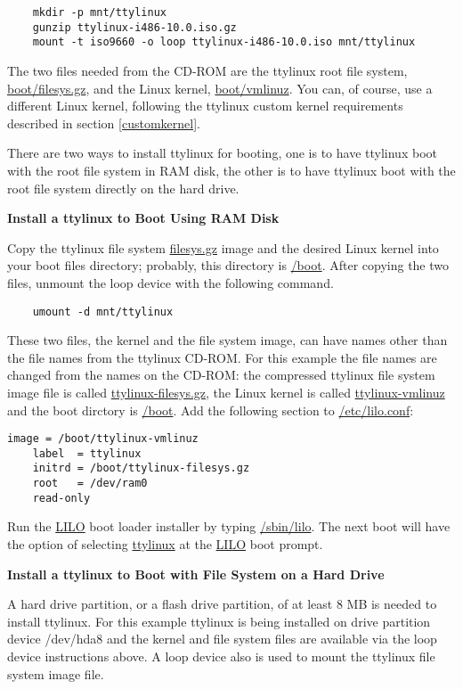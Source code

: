 \documentclass[10pt]{article}
\begin{document}
\begin{lstlisting}
	mkdir -p mnt/ttylinux
	gunzip ttylinux-i486-10.0.iso.gz
	mount -t iso9660 -o loop ttylinux-i486-10.0.iso mnt/ttylinux
\end{lstlisting}

The two files needed from the CD-ROM are the ttylinux root file system,
\url{boot/filesys.gz}, and the Linux kernel, \url{boot/vmlinuz}. You
can, of course, use a different Linux kernel, following the ttylinux custom
kernel requirements described in section \ref{customkernel}.

There are two ways to install ttylinux for booting, one is to have ttylinux
boot with the root file system in RAM disk, the other is to have ttylinux boot
with the root file system directly on the hard drive.

{\bf Install a ttylinux to Boot Using RAM Disk}

Copy the ttylinux file system \url{filesys.gz} image and the desired Linux
kernel into your boot files directory; probably, this directory is \url{/boot}.
After copying the two files, unmount the loop device with the following command.

\begin{lstlisting}
	umount -d mnt/ttylinux
\end{lstlisting}

These two files, the kernel and the file system image, can have names other
than the file names from the ttylinux CD-ROM. For this example the file names
are changed from the names on the CD-ROM: the compressed ttylinux file system
image file is called \url{ttylinux-filesys.gz}, the Linux kernel is called
\url{ttylinux-vmlinuz} and the boot dirctory is \url{/boot}. Add the following
section to \url{/etc/lilo.conf}:

\begin{lstlisting}
image = /boot/ttylinux-vmlinuz
	label  = ttylinux
	initrd = /boot/ttylinux-filesys.gz
	root   = /dev/ram0
	read-only
\end{lstlisting}

Run the \url{LILO} boot loader installer by typing \url{/sbin/lilo}. The next
boot will have the option of selecting \url{ttylinux} at the \url{LILO} boot
prompt.

{\bf Install a ttylinux to Boot with File System on a Hard Drive}

A hard drive partition, or a flash drive partition, of at least 8 MB is needed
to install ttylinux. For this example ttylinux is being installed on drive
partition device /dev/hda8 and the kernel and file system files are available
via the loop device instructions above. A loop device also is used to mount the
ttylinux file system image file.
\end{document}
